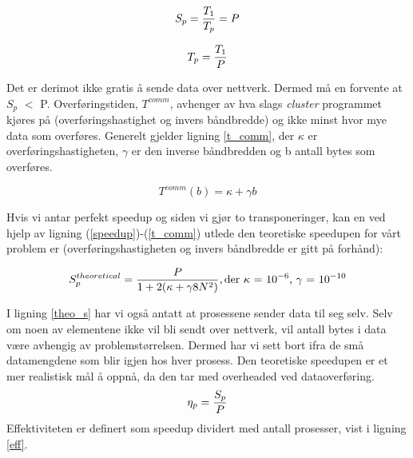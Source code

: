 \documentclass{article}
\begin{document}
\begin{equation}
	\label{speedup}
	S_{p} = {T_{1} \over T_{p}} = P
\end{equation} 

\begin{equation}
	\label{t_p}
	T_{p} = {T_{1} \over P}
\end{equation}

Det er derimot ikke gratis å sende data over nettverk. Dermed må en forvente at $S_p$ $<$ P. Overføringstiden, $T^{comm}$, avhenger av hva slags \emph{cluster} programmet kjøres på (overføringshastighet og invers båndbredde) og ikke minst hvor mye data som overføres. Generelt gjelder ligning \ref{t_comm}, der $\kappa$ er overføringshastigheten, $\gamma$ er den inverse båndbredden og b antall bytes som overføres.

\begin{equation}
	\label{t_comm}
	T^{comm}(b) = \kappa + \gamma b
\end{equation} 

Hvis vi antar perfekt speedup og siden vi gjør to transponeringer, kan en ved hjelp av ligning (\ref{speedup})-(\ref{t_comm}) utlede den teoretiske speedupen for vårt problem er (overføringshastigheten og invers båndbredde er gitt på forhånd):

\begin{equation}
	\label{theo_s}
	S_{p}^{theoretical} = {P \over 1 + 2(\kappa + \gamma 8N^{2})}, \text{der $\kappa$ = $10^{-6}$, $\gamma$ = $10^{-10}$}
\end{equation}


I ligning \ref{theo_s} har vi også antatt at prosessene sender data til seg selv. Selv om noen av elementene ikke vil bli sendt over nettverk, vil antall bytes i data være avhengig av problemstørrelsen. Dermed har vi sett bort ifra de små datamengdene som blir igjen hos hver prosess. Den teoretiske speedupen er et mer realistisk mål å oppnå, da den tar med overheaded ved dataoverføring. \\ 

\begin{equation}
	\label{eff}
	\eta_{p} = {S_{p} \over P} 
\end{equation}
Effektiviteten er definert som speedup dividert med antall prosesser, vist i ligning \ref{eff}. \\ 
\end{document}
